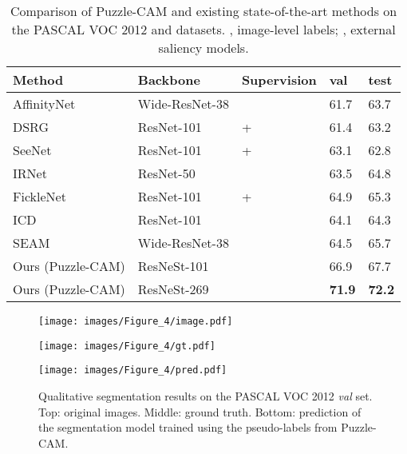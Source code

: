 \documentclass{article}
\begin{document}
\begin{table}[t]
\caption{
Comparison of Puzzle-CAM and existing state-of-the-art methods on the PASCAL VOC 2012  and  datasets. 
, image-level labels;  , external saliency models.
}
\footnotesize
\centering
{
\begin{tabu} to \linewidth{X[c,1.2] X[c,1.0] X[c,0.75]  | X[c,0.2]  X[c,0.2] }  \hline \hline
Method  & Backbone & Supervision & val & test \\ \hline
AffinityNet~\cite{ahn2018learning} & Wide-ResNet-38 &  & 61.7 & 63.7 \\
DSRG~\cite{huang2018weakly} & ResNet-101 &  +  & 61.4 & 63.2 \\ 
SeeNet~\cite{hou2018self} & ResNet-101 &  +  & 63.1 & 62.8 \\
IRNet~\cite{ahn2018learning} & ResNet-50 &  & 63.5 & 64.8 \\
FickleNet~\cite{lee2019ficklenet} & ResNet-101 &  +  & 64.9 & 65.3 \\ 
ICD~\cite{fan2020learning} & ResNet-101 &  & 64.1 & 64.3 \\ 
SEAM~\cite{Wang_2020_CVPR} & Wide-ResNet-38 &  & 64.5 & 65.7 \\ \hline
Ours (Puzzle-CAM) & ResNeSt-101 &  & 66.9 & 67.7 \\
Ours (Puzzle-CAM) & ResNeSt-269 &  & \textbf{71.9} & \textbf{72.2} \\

\hline\hline
\end{tabu}
}
\label{tb:final}
\end{table}

\begin{figure}
\begin{minipage}[b]{1.0\linewidth}
  \centering
  \centerline{\texttt{[image: images/Figure\_4/image.pdf]}}
\end{minipage}

\begin{minipage}[b]{1.0\linewidth}
  \centering
  \centerline{\texttt{[image: images/Figure\_4/gt.pdf]}}
\end{minipage}

\begin{minipage}[b]{1.0\linewidth}
  \centering
  \centerline{\texttt{[image: images/Figure\_4/pred.pdf]}}
\end{minipage}

\caption{Qualitative segmentation results on the PASCAL VOC 2012 \textit{val} set. Top: original images. Middle: ground truth. Bottom: prediction of the segmentation model trained using the pseudo-labels from Puzzle-CAM.}
\label{fig:result}
\vspace{-4mm}
\end{figure}
\end{document}
